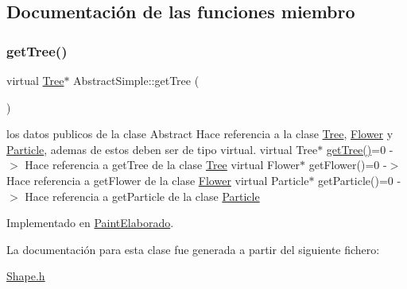 \subsection{Documentación de las funciones miembro}
\mbox{\label{class_abstract_simple_ad90f5d7d3415a29af8bbf10ad8d89772}} 
\subsubsection{\texorpdfstring{getTree()}{getTree()}}
{\footnotesize\ttfamily virtual \mbox{\hyperlink{class_tree}{Tree}}$\ast$ Abstract\+Simple\+::get\+Tree (\begin{DoxyParamCaption}{ }\end{DoxyParamCaption})\hspace{0.3cm}{\ttfamily [pure virtual]}}

los datos publicos de la clase Abstract Hace referencia a la clase \mbox{\hyperlink{class_tree}{Tree}}, \mbox{\hyperlink{class_flower}{Flower}} y \mbox{\hyperlink{class_particle}{Particle}}, ademas de estos deben ser de tipo virtual. virtual Tree$\ast$ \mbox{\hyperlink{class_abstract_simple_ad90f5d7d3415a29af8bbf10ad8d89772}{get\+Tree()}}=0 -\/$>$ Hace referencia a get\+Tree de la clase \mbox{\hyperlink{class_tree}{Tree}} virtual Flower$\ast$ get\+Flower()=0 -\/$>$ Hace referencia a get\+Flower de la clase \mbox{\hyperlink{class_flower}{Flower}} virtual Particle$\ast$ get\+Particle()=0 -\/$>$ Hace referencia a get\+Particle de la clase \mbox{\hyperlink{class_particle}{Particle}} 

Implementado en \mbox{\hyperlink{class_paint_elaborado_abaa86a2ff7ea9200eef2e000e1ee9bc7}{Paint\+Elaborado}}.



La documentación para esta clase fue generada a partir del siguiente fichero\+:\begin{DoxyCompactItemize}
\item 
\mbox{\hyperlink{_shape_8h}{Shape.\+h}}\end{DoxyCompactItemize}
